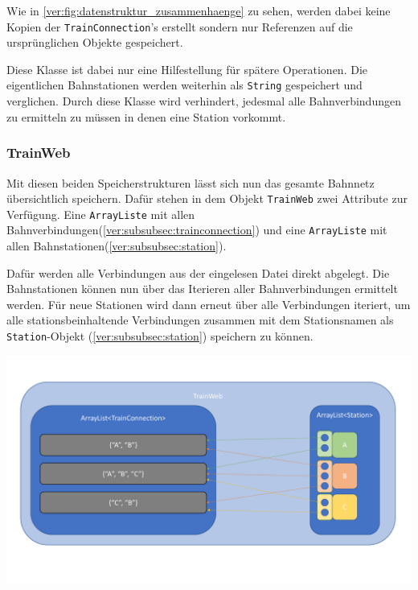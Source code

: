 Wie in \ref{ver:fig:datenstruktur_zusammenhaenge} zu sehen, werden dabei keine Kopien der \texttt{TrainConnection}'s erstellt sondern nur Referenzen auf die ursprünglichen Objekte gespeichert.

Diese Klasse ist dabei nur eine Hilfestellung für spätere Operationen. Die eigentlichen Bahnstationen werden weiterhin als \texttt{String} gespeichert und verglichen. Durch diese Klasse wird verhindert, jedesmal alle Bahnverbindungen zu ermitteln zu müssen in denen eine Station vorkommt.\\

\subsubsection{TrainWeb}\label{ver:subsubsec:trainweb}
Mit diesen beiden Speicherstrukturen lässt sich nun das gesamte Bahnnetz übersichtlich speichern. Dafür stehen in dem Objekt \texttt{TrainWeb} zwei Attribute zur Verfügung. Eine \texttt{ArrayListe} mit allen Bahnverbindungen(\ref{ver:subsubsec:trainconnection}) und eine \texttt{ArrayListe} mit allen Bahnstationen(\ref{ver:subsubsec:station}).

Dafür werden alle Verbindungen aus der eingelesen Datei direkt abgelegt. Die Bahnstationen können nun über das Iterieren aller Bahnverbindungen ermittelt werden. Für neue Stationen wird dann erneut über alle Verbindungen iteriert, um alle stationsbeinhaltende Verbindungen zusammen mit dem Stationsnamen als \texttt{Station}-Objekt (\ref{ver:subsubsec:station}) speichern zu können.\\

\begin{center}
    \includegraphics[width=\linewidth]{images/Datenstruktur_Zusammenhaenge.pdf}
    \label{ver:fig:datenstruktur_zusammenhaenge}
\end{center}


